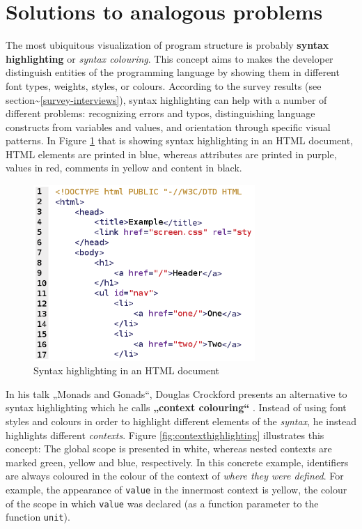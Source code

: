 \section{Solutions to analogous
problems}\label{solutions-to-analogous-problems}

The most ubiquitous visualization of program structure is probably
\textbf{syntax highlighting} or \emph{syntax colouring}. This concept
aims to makes the developer distinguish entities of the programming
language by showing them in different font types, weights, styles, or
colours. According to the survey results (see
section\textasciitilde{}\ref{survey-interviews}), syntax highlighting
can help with a number of different problems: recognizing errors and
typos, distinguishing language constructs from variables and values, and
orientation through specific visual patterns. In Figure
\ref{fig:syntaxhighlighting} that is showing syntax highlighting in an
HTML document, HTML elements are printed in blue, whereas attributes are
printed in purple, values in red, comments in yellow and content in
black.

\begin{figure}[htbp]
\centering
\includegraphics[keepaspectratio,width=0.75\textwidth,height=0.75\textheight]{img/syntax_highlighting.png}
\caption{Syntax highlighting in an HTML document}
\label{fig:syntaxhighlighting}
\end{figure}

In his talk „Monads and Gonads“, Douglas Crockford presents an
alternative to syntax highlighting which he calls \textbf{„context
colouring“} \citeyear{crockford}. Instead of using font styles and
colours in order to highlight different elements of the \emph{syntax},
he instead highlights different \emph{contexts}. Figure
\ref{fig:contexthighlighting} illustrates this concept: The global scope
is presented in white, whereas nested contexts are marked green, yellow
and blue, respectively. In this concrete example, identifiers are always
coloured in the colour of the context of \emph{where they were defined}.
For example, the appearance of \texttt{value} in the innermost context
is yellow, the colour of the scope in which \texttt{value} was declared
(as a function parameter to the function \texttt{unit}).


